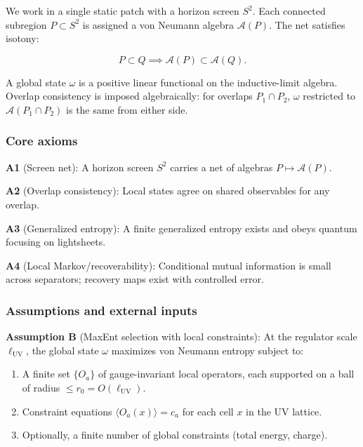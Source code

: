 \documentclass[11pt,a4paper]{article}
\theoremstyle{remark}
\providecommand{\tightlist}{%
  \setlength{\itemsep}{0pt}\setlength{\parskip}{0pt}}
\begin{document}
We work in a single static patch with a horizon screen \(S^2\). Each connected
subregion \(P \subset S^2\) is assigned a von Neumann algebra \(\mathcal{A}(P)\). The net
satisfies isotony:

\[
P \subset Q \implies \mathcal{A}(P) \subset \mathcal{A}(Q).
\]

A global state \(\omega\) is a positive linear functional on the inductive-limit
algebra. Overlap consistency is imposed algebraically: for overlaps \(P_1 \cap P_2\),
\(\omega\) restricted to \(\mathcal{A}(P_1 \cap P_2)\) is the same from either side.

\subsubsection{Core axioms}\label{core-axioms}

\textbf{A1} (Screen net): A horizon screen \(S^2\) carries a net of algebras \(P \mapsto \mathcal{A}(P)\).

\textbf{A2} (Overlap consistency): Local states agree on shared observables for any
overlap.

\textbf{A3} (Generalized entropy): A finite generalized entropy exists and obeys quantum
focusing on lightsheets.

\textbf{A4} (Local Markov/recoverability): Conditional mutual information is small
across separators; recovery maps exist with controlled error.

\subsubsection{Assumptions and external inputs}\label{assumptions-and-external-inputs}

\textbf{Assumption B} (MaxEnt selection with local constraints): At the regulator scale
\(\ell_{\mathrm{UV}}\), the global state \(\omega\) maximizes von Neumann entropy subject to:

\begin{enumerate}
\def\labelenumi{\arabic{enumi}.}
\tightlist
\item
  A finite set \(\{O_a\}\) of gauge-invariant local operators, each supported on a
  ball of radius \(\le r_0 = O(\ell_{\mathrm{UV}})\).
\item
  Constraint equations \(\langle O_a(x) \rangle = c_a\) for each cell \(x\) in the
  UV lattice.
\item
  Optionally, a finite number of global constraints (total energy, charge).
\end{enumerate}
\end{document}
